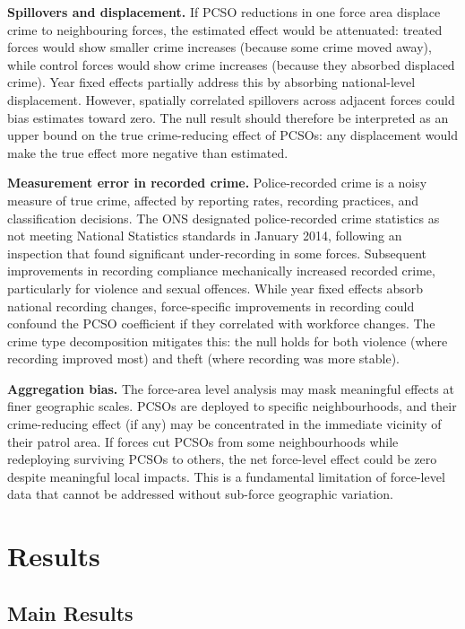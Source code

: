 \documentclass[12pt]{article}
\begin{document}
\textbf{Spillovers and displacement.} If PCSO reductions in one force area displace crime to neighbouring forces, the estimated effect would be attenuated: treated forces would show smaller crime increases (because some crime moved away), while control forces would show crime increases (because they absorbed displaced crime). Year fixed effects partially address this by absorbing national-level displacement. However, spatially correlated spillovers across adjacent forces could bias estimates toward zero. The null result should therefore be interpreted as an upper bound on the true crime-reducing effect of PCSOs: any displacement would make the true effect more negative than estimated.

\textbf{Measurement error in recorded crime.} Police-recorded crime is a noisy measure of true crime, affected by reporting rates, recording practices, and classification decisions. The ONS designated police-recorded crime statistics as not meeting National Statistics standards in January 2014, following an inspection that found significant under-recording in some forces. Subsequent improvements in recording compliance mechanically increased recorded crime, particularly for violence and sexual offences. While year fixed effects absorb national recording changes, force-specific improvements in recording could confound the PCSO coefficient if they correlated with workforce changes. The crime type decomposition mitigates this: the null holds for both violence (where recording improved most) and theft (where recording was more stable).

\textbf{Aggregation bias.} The force-area level analysis may mask meaningful effects at finer geographic scales. PCSOs are deployed to specific neighbourhoods, and their crime-reducing effect (if any) may be concentrated in the immediate vicinity of their patrol area. If forces cut PCSOs from some neighbourhoods while redeploying surviving PCSOs to others, the net force-level effect could be zero despite meaningful local impacts. This is a fundamental limitation of force-level data that cannot be addressed without sub-force geographic variation.


\section{Results}

\subsection{Main Results}
\end{document}
